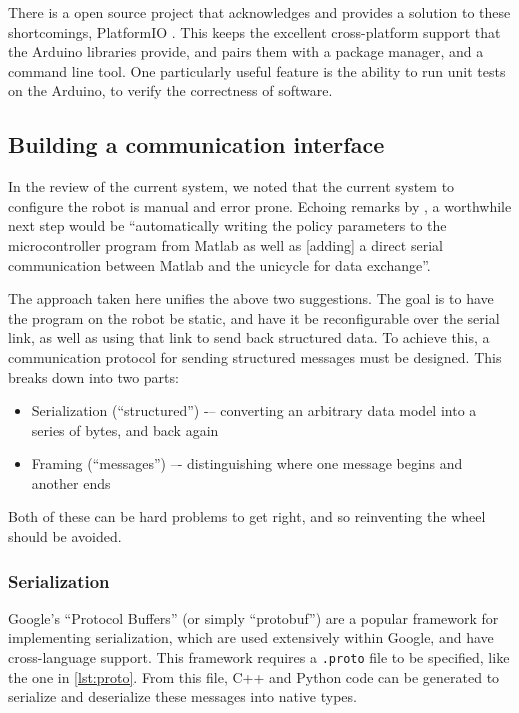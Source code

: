 \documentclass[main.tex]{subfiles}
\begin{document}
	There is a open source project that acknowledges and provides a solution to these shortcomings, PlatformIO \cite{platformio}.
	This keeps the excellent cross-platform support that the Arduino libraries provide, and pairs them with a package manager, and a command line tool.
	One particularly useful feature is the ability to run unit tests on the Arduino, to verify the correctness of software.

\subsection{Building a communication interface}

	In the review of the current system, we noted that the current system to configure the robot is manual and error prone.
	Echoing remarks by \citeauthor{aleksi} \cite[p.~34]{aleksi}, a worthwhile next step would be \enquote{automatically writing the policy parameters to the microcontroller program from Matlab as well as [adding] a direct serial communication between Matlab and the unicycle for data exchange}.

	The approach taken here unifies the above two suggestions.
	The goal is to have the program on the robot be static, and have it be reconfigurable over the serial link, as well as using that link to send back structured data.
	To achieve this, a communication protocol for sending structured messages must be designed. This breaks down into two parts:
	\begin{itemize}[noitemsep]
		\item Serialization (\enquote{structured}) -– converting an arbitrary data model into a series of bytes, and back again
		\item Framing (\enquote{messages}) –- distinguishing where one message begins and another ends
	\end{itemize}
	Both of these can be hard problems to get right, and so reinventing the wheel should be avoided.

	\subsubsection{Serialization}
		Google’s \enquote{Protocol Buffers}\cite{protobuf} (or simply \enquote{protobuf}) are a popular framework for implementing serialization, which are used extensively within Google, and have cross-language support.
		This framework requires a \texttt{.proto} file to be specified, like the one in \cref{lst:proto}.
		From this file, C++ and Python code can be generated to serialize and deserialize these messages into native types.
\end{document}

